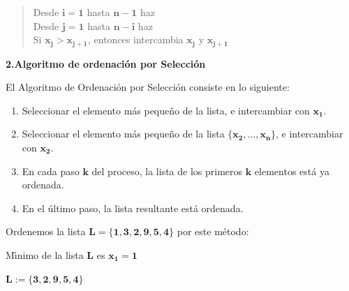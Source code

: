 \documentclass[ebook,oneside]{memoir}
\newcommand{\bolds}[1]{\boldsymbol{#1}}
\begin{document}
\vspace*{0.5cm}

    \begin{quotation}
        \hspace*{0cm} \textsf{Desde} $\bolds{i=1}$ \textsf{hasta} $\bolds{n-1}$ \textsf{haz} \\[1ex]
        \hspace*{0.8cm} \textsf{Desde} $\bolds{j=1}$ \textsf{hasta} $\bolds{n-i}$ \textsf{haz} \\[1ex]
        \hspace*{1.2cm} \textsf{Si} $\bolds{x_j>x_{j+1}}$, \textsf{entonces} intercambia $\bolds{x_j}$ y $\bolds{x_{j+1}}$ \\[1ex]
    \end{quotation}


\textbf{2.Algoritmo de ordenaci\'{o}n por Selecci\'{o}n}

\vspace{0.5cm}
El Algoritmo de Ordenaci\'{o}n por Selecci\'{o}n consiste en lo siguiente:

        \begin{enumerate}
            \item Seleccionar el elemento m\'{a}s peque\~{n}o de la lista, e intercambiar con $\bolds{x_1}$.
            \item Seleccionar el elemento m\'{a}s peque\~{n}o de la lista $\bolds{\{x_2,\ldots,x_n\}}$, e intercambiar con $\bolds{x_2}$.
            \item En cada paso $\bolds{k}$ del proceso, la lista de los primeros $\bolds{k}$ elementos est\'{a} ya ordenada.
            \item En el \'{u}ltimo paso, la lista resultante est\'{a} ordenada.
        \end{enumerate}


Ordenemos la lista $\bolds{L=\{1, 3, 2, 9, 5, 4\}}$  por este m\'{e}todo:

        \vspace*{0.7cm}

        \begin{minipage}{.6\textwidth}
        M\'{\i}nimo de la lista $\bolds{L}$ es $\bolds{x_1=1}$
        \end{minipage}\hfill
        \begin{minipage}{.3\textwidth}
         $\bolds{L:=\{3,2,9,5,4\}}$
        \end{minipage}
\end{document}
